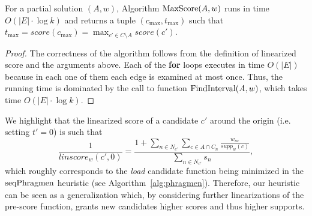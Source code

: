 \begin{lemma}\label{lem:maxscore}
For a partial solution $(A,w)$, Algorithm $\operatorname{MaxScore}(A,w)$ runs in time $O(|E|\cdot \log k)$ and returns a tuple $(c_{\max}, t_{\max})$ such that $t_{\max}=score(c_{\max})=\max_{c'\in C\setminus A} score(c')$.
\end{lemma}
\begin{proof}
The correctness of the algorithm follows from the definition of linearized score and the arguments above. Each of the \textbf{for} loops executes in time $O(|E|)$ because in each one of them each edge is examined at most once. Thus, the running time is dominated by the call to function $\operatorname{FindInterval}(A,w)$, which takes time $O(|E|\cdot \log k)$.
\end{proof}

We highlight that the linearized score of a candidate $c'$ around the origin (i.e. setting $t'=0$) is such that %
%
$$\frac{1}{linscore_w(c',0)}=\frac{1+\sum_{n\in N_{c'}} \sum_{c\in A\cap C_n} \frac{w_{nc}}{supp_w(c)}}{\sum_{n\in N_{c'}} s_n},$$
%
which roughly corresponds to the \emph{load} candidate function being minimized in the $\operatorname{seqPhragmen}$ heuristic (see Algorithm~\ref{alg:phragmen}). Therefore, our heuristic can be seen as a generalization which, by considering further linearizations of the pre-score function, grants new candidates higher scores and thus higher supports. 